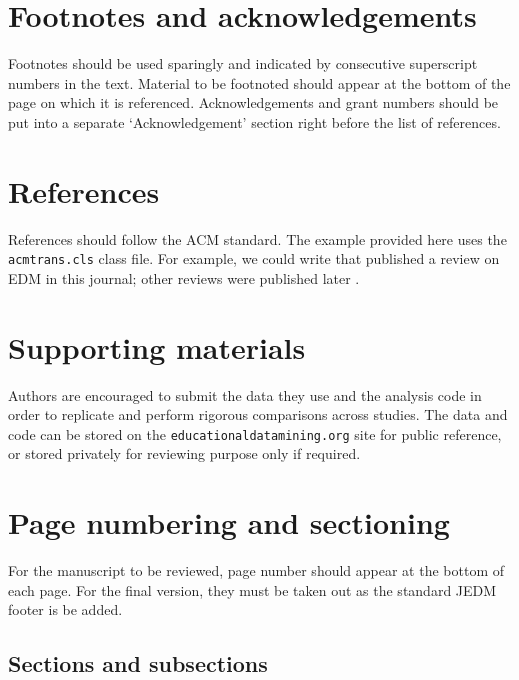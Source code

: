 \documentclass[a4,notitlepage,12pt]{jedm}
\begin{document}
\section{Footnotes and acknowledgements}

Footnotes should be used sparingly and indicated by consecutive superscript numbers in the text. Material to be footnoted should appear at the bottom of the page on which it is referenced. Acknowledgements and grant numbers should be put into a separate `Acknowledgement' section right before the list of references.

\section{References}

References should follow the ACM standard.  The example provided here uses the \texttt{acmtrans.cls} class file. For example, we could write that  published a review on EDM in this journal; other reviews were published later \cite[for eg.]{romero2010educational}.


\section{Supporting materials}

Authors are encouraged to submit the data they use and the analysis code in order to replicate and perform rigorous comparisons across studies.  The data and code can be stored on the \texttt{educationaldatamining.org} site for public reference, or stored privately for reviewing purpose only if required.


\section{Page numbering and sectioning}

For the manuscript to be reviewed, page number should appear at the bottom of each page.  For the final version, they must be taken out as the standard JEDM footer is be added.

\subsection{Sections and subsections}
\end{document}
